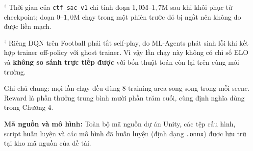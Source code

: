 \begin{table}[H]
\vspace{0.2cm}
{\footnotesize
$^{\dagger}$ Thời gian của \texttt{ctf\_sac\_v1} chỉ tính đoạn $1{,}0$M--$1{,}7$M sau khi khôi phục từ checkpoint; đoạn $0$--$1{,}0$M chạy trong một phiên trước đó bị ngắt nên không đo được liền mạch.

\smallskip
$^{\ddagger}$ Riêng DQN trên Football phải tắt self-play, do ML-Agents phát sinh lỗi khi kết hợp trainer off-policy với ghost trainer. Vì vậy lần chạy này không có chỉ số ELO và \textbf{không so sánh trực tiếp được} với bốn thuật toán còn lại trên cùng môi trường.

\smallskip
Ghi chú chung: mọi lần chạy đều dùng 8 training area song song trong mỗi scene. Reward là phần thưởng trung bình mười phần trăm cuối, cùng định nghĩa dùng trong Chương 4.}
\end{table}

\vspace{0.5cm}
\noindent\textbf{Mã nguồn và mô hình:} Toàn bộ mã nguồn dự án Unity, các tệp cấu hình,
script huấn luyện và các mô hình đã huấn luyện (định dạng \texttt{.onnx}) được lưu trữ
tại kho mã nguồn của đề tài.
